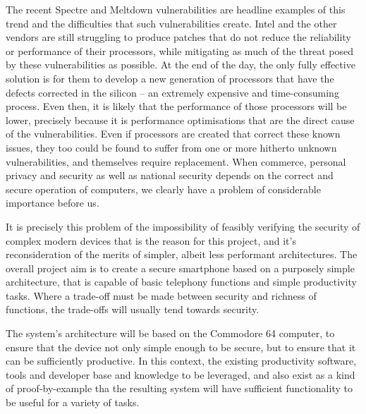         The recent Spectre  and Meltdown  vulnerabilities are headline examples of this trend and the difficulties that such vulnerabilities create.
        Intel and the other vendors are still struggling to produce patches that do not reduce the reliability or performance of their processors, while mitigating as much of the threat posed by these vulnerabilities as possible.
        At the end of the day, the only fully effective solution is for them to develop a new generation of processors that have the defects corrected in the silicon – an extremely expensive and time-consuming process.
        Even then, it is likely that the performance of those processors will be lower, precisely because it is performance optimisations that are the direct cause of the vulnerabilities.
        Even if processors are created that correct these known issues, they too could be found to suffer from one or more hitherto unknown vulnerabilities, and themselves require replacement.
        When commerce, personal privacy and security as well as national security depends on the correct and secure operation of computers, we clearly have a problem of considerable importance before us.

        It is precisely this problem of the impossibility of feasibly verifying the security of complex modern devices that is the reason for this project, and it's reconsideration of the merits of simpler, albeit less performant architectures.
The overall project aim is to create a secure smartphone based on a purposely simple architecture, that is capable of basic telephony functions and simple productivity tasks.
Where a trade-off must be made between security and richness of functions, the trade-offs will usually tend towards security.


The system’s architecture will be based on the Commodore 64 computer, to ensure that the device not only simple enough to be secure, but to ensure that it can be sufficiently productive. In this context, the existing productivity software, tools and developer base and knowledge to be leveraged, and also exist as a kind of proof-by-example tha the resulting system will have sufficient functionality to be useful for a variety of tasks.

        

